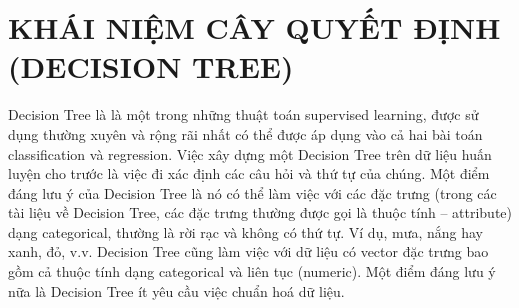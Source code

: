 \chapter{KHÁI NIỆM CÂY QUYẾT ĐỊNH (DECISION TREE)}

Decision Tree là là một trong những thuật toán supervised learning, được sử dụng thường xuyên và rộng rãi nhất có thể được áp dụng vào cả hai bài toán classification và regression. Việc xây dựng một Decision Tree trên dữ liệu huấn luyện cho trước là việc đi xác định các câu hỏi và thứ tự của chúng. Một điểm đáng lưu ý của Decision Tree là nó có thể làm việc với các đặc trưng (trong các tài liệu về Decision Tree, các đặc trưng thường được gọi là thuộc tính – attribute) dạng categorical, thường là rời rạc và không có thứ tự. Ví dụ, mưa, nắng hay xanh, đỏ, v.v. Decision Tree cũng làm việc với dữ liệu có vector đặc trưng bao gồm cả thuộc tính dạng categorical và liên tục (numeric). Một điểm đáng lưu ý nữa là Decision Tree ít yêu cầu việc chuẩn hoá dữ liệu.

